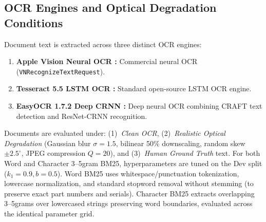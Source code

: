 \subsection{OCR Engines and Optical Degradation Conditions}
Document text is extracted across three distinct OCR engines:
\begin{enumerate}
    \setlength{\itemsep}{0.2pt plus 0.1pt}
    \setlength{\parskip}{0pt}
    \item \textbf{Apple Vision Neural OCR \cite{apple2020vision}:} Commercial neural OCR (\texttt{VNRecognizeTextRequest}).
    \item \textbf{Tesseract 5.5 LSTM OCR \cite{smith2007tesseract}:} Standard open-source LSTM OCR engine.
    \item \textbf{EasyOCR 1.7.2 Deep CRNN \cite{jaidedai2020easyocr}:} Deep neural OCR combining CRAFT text detection and ResNet-CRNN recognition.
\end{enumerate}
Documents are evaluated under: (1)~\emph{Clean OCR}, (2)~\emph{Realistic Optical Degradation} (Gaussian blur $\sigma=1.5$, bilinear 50\% downscaling, random skew $\pm 2.5^\circ$, JPEG compression $Q=20$), and (3)~\emph{Human Ground Truth} text. For both Word and Character 3--5gram BM25, hyperparameters are tuned on the Dev split ($k_1=0.9, b=0.5$). Word BM25 uses whitespace/punctuation tokenization, lowercase normalization, and standard stopword removal without stemming (to preserve exact part numbers and serials). Character BM25 extracts overlapping 3--5grams over lowercased strings preserving word boundaries, evaluated across the identical parameter grid.

